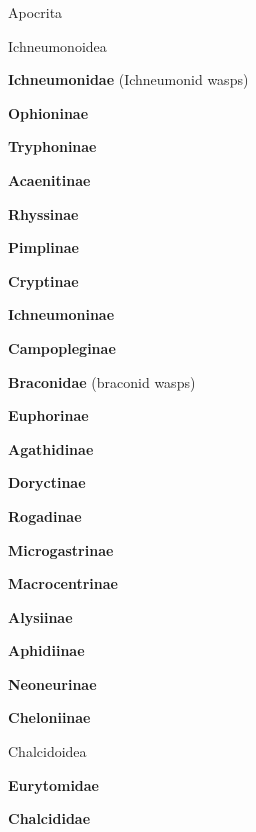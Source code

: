 \documentclass[letterpaper,10pt]{article}
\begin{document}
{\makebox[0.20cm]{}  Apocrita \par
\makebox[0.4cm]{}  Ichneumonoidea \par
\makebox[0.6cm]{}  \textbf{Ichneumonidae} (Ichneumonid wasps) \par
\makebox[0.8cm]{}  \textbf{Ophioninae} \par
\makebox[0.8cm]{}  \textbf{Tryphoninae} \par
\makebox[0.8cm]{}  \textbf{Acaenitinae} \par
\makebox[0.8cm]{}  \textbf{Rhyssinae} \par
\makebox[0.8cm]{}  \textbf{Pimplinae} \par
\makebox[0.8cm]{}  \textbf{Cryptinae} \par
\makebox[0.8cm]{}  \textbf{Ichneumoninae} \par
\makebox[0.8cm]{}  \textbf{Campopleginae} \par
\makebox[0.6cm]{}  \textbf{Braconidae} (braconid wasps) \par
\makebox[0.8cm]{}  \textbf{Euphorinae} \par
\makebox[0.8cm]{}  \textbf{Agathidinae} \par
\makebox[0.8cm]{}  \textbf{Doryctinae} \par
\makebox[0.8cm]{}  \textbf{Rogadinae} \par
\makebox[0.8cm]{}  \textbf{Microgastrinae} \par
\makebox[0.8cm]{}  \textbf{Macrocentrinae} \par
\makebox[0.8cm]{}  \textbf{Alysiinae} \par
\makebox[0.8cm]{}  \textbf{Aphidiinae} \par
\makebox[0.8cm]{}  \textbf{Neoneurinae} \par
\makebox[0.8cm]{}  \textbf{Cheloniinae} \par
\makebox[0.4cm]{}  Chalcidoidea \par
\makebox[0.6cm]{}  \textbf{Eurytomidae} \par
\makebox[0.6cm]{}  \textbf{Chalcididae} \par
}
\end{document}
